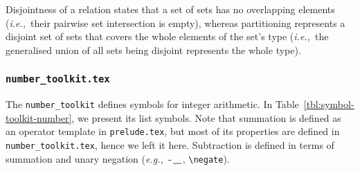 \documentclass{article}
\newcommand{\emfile}[1]{\texttt{#1}}%
\newcommand{\preludefile}{\emfile{prelude.tex}}
\newcommand{\numtkfile}{\emfile{number\_toolkit.tex}}
\begin{document}
Disjointness of a relation states that a set of sets has no overlapping elements
(\textit{i.e.,}~their pairwise set intersection is empty), whereas partitioning
represents a disjoint set of sets that covers the whole elements of the set's type
(\textit{i.e.,}~the generalised union of all sets being disjoint represents the whole type).

\subsubsection{\numtkfile}\label{sec:symbol-toolkit-number}

The \texttt{number\_toolkit} defines symbols for integer arithmetic.
In Table~\ref{tbl:symbol-toolkit-number}, we present its list symbols.
Note that summation is defined as an operator template in \preludefile,
but most of its properties are defined in \numtkfile, hence we left it here.
Subtraction is defined in terms of summation and unary negation
(\textit{e.g.,}~$\negate\varg$, \verb|\negate|).
%
\end{document}
